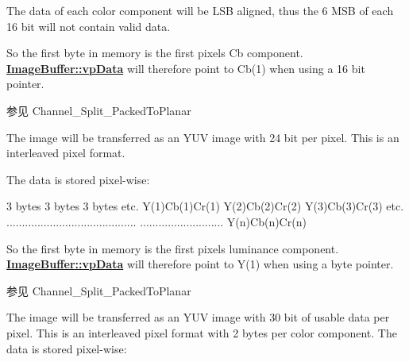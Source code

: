 \begin{Desc}
\begin{description}
The data of each color component will be L\+S\+B aligned, thus the 6 M\+S\+B of each 16 bit will not contain valid data.

So the first byte in memory is the first pixels Cb component. {\bfseries \hyperlink{struct_image_buffer_ab67c9c21d749e786302c848b508e0673}{Image\+Buffer\+::vp\+Data}} will therefore point to Cb(1) when using a 16 bit pointer.

\begin{DoxySeeAlso}{参见}
Channel\+\_\+\+Split\+\_\+\+Packed\+To\+Planar 
\end{DoxySeeAlso}
\item[{\em 
\hypertarget{group___common_interface_gga02e0fc32ff10e0bc0f2e8b9c321d65c9a35fbd043306138c571432e0a797b22f4}{idpf\+Y\+U\+V444\+Packed}\label{group___common_interface_gga02e0fc32ff10e0bc0f2e8b9c321d65c9a35fbd043306138c571432e0a797b22f4}
}]The image will be transferred as an Y\+U\+V image with 24 bit per pixel. This is an interleaved pixel format.

The data is stored pixel-\/wise\+:


\begin{DoxyCode}
3 bytes        3 bytes        3 bytes      etc.
Y(1)Cb(1)Cr(1) Y(2)Cb(2)Cr(2) Y(3)Cb(3)Cr(3) etc.
..........................................
...........................   Y(n)Cb(n)Cr(n)
\end{DoxyCode}


So the first byte in memory is the first pixels luminance component. {\bfseries \hyperlink{struct_image_buffer_ab67c9c21d749e786302c848b508e0673}{Image\+Buffer\+::vp\+Data}} will therefore point to Y(1) when using a byte pointer.

\begin{DoxySeeAlso}{参见}
Channel\+\_\+\+Split\+\_\+\+Packed\+To\+Planar 
\end{DoxySeeAlso}
\item[{\em 
\hypertarget{group___common_interface_gga02e0fc32ff10e0bc0f2e8b9c321d65c9a44339ef88740f1dc80870b5d8185c18d}{idpf\+Y\+U\+V444\+\_\+10\+Packed}\label{group___common_interface_gga02e0fc32ff10e0bc0f2e8b9c321d65c9a44339ef88740f1dc80870b5d8185c18d}
}]The image will be transferred as an Y\+U\+V image with 30 bit of usable data per pixel. This is an interleaved pixel format with 2 bytes per color component. The data is stored pixel-\/wise\+:



\end{description}
\end{Desc}
